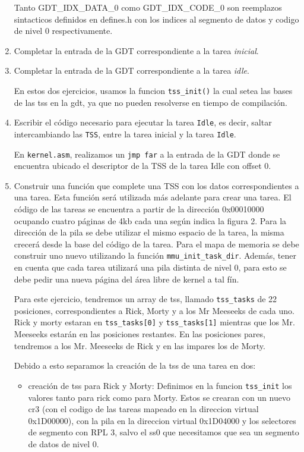 \documentclass[a4paper]{article}
\begin{document}
\begin{enumerate}[label=\alph*)]
 	
 	Tanto GDT\_IDX\_DATA\_0 como GDT\_IDX\_CODE\_0 son reemplazos sintacticos definidos en defines.h con los indices al segmento de datos y codigo de nivel 0 respectivamente.
 	
 	\item Completar la entrada de la GDT correspondiente a la tarea \textit{inicial}.
 	\item Completar la entrada de la GDT correspondiente a la tarea \textit{idle}.
 	
 	En estos dos ejercicios, usamos la funcion \texttt{tss\_init()} la cual setea las bases de las tss en la gdt, ya que no pueden resolverse en tiempo de compilaci\'on.
 	
 	\item Escribir el código necesario para ejecutar la tarea \texttt{Idle}, es decir, saltar intercambiando las \texttt{TSS}, entre la tarea inicial y la tarea \texttt{Idle}.
 	
 	En \texttt{kernel.asm}, realizamos un \texttt{jmp far} a la entrada de la GDT donde se encuentra ubicado el descriptor de la TSS de la tarea Idle con offset 0.
 	
 	\item Construir una función que complete una TSS con los datos correspondientes a una tarea. Esta función será utilizada más adelante para crear una tarea. El código de las tareas se encuentra a partir de la dirección 0x00010000 ocupando cuatro páginas de 4kb cada una según indica la figura 2. Para la dirección de la pila se debe utilizar el mismo espacio de la tarea, la misma crecerá
 	desde la base del código de la tarea. Para el mapa de memoria se debe construir uno nuevo utilizando la función \texttt{mmu\_init\_task\_dir}. Además, tener en cuenta que cada tarea utilizará una pila distinta de nivel 0, para esto se debe pedir una nueva página del área libre de kernel a tal f\'in.
 	
 	Para este ejercicio, tendremos un array de tss, llamado \texttt{tss\_tasks} de 22 posiciones, correspondientes a Rick, Morty y a los Mr Meeseeks de cada uno. Rick y morty estaran en \texttt{tss\_tasks[0]} y \texttt{tss\_tasks[1]} mientras que los Mr. Meeseeks estar\'an en las posiciones restantes. En las posiciones pares, tendremos a los Mr. Meeseeks de Rick y en las impares los de Morty. 
 	
 	Debido a esto separamos la creaci\'on de la tss de una tarea en dos:
 	
 	\begin{itemize}
 		\item creaci\'on de tss para Rick y Morty: Definimos en la funcion \texttt{tss\_init} los valores tanto para rick como para Morty. Estos se crearan con un nuevo cr3 (con el codigo de las tareas mapeado en la direccion virtual 0x1D00000), con la pila en la direccion virtual 0x1D04000 y los selectores de segmento con RPL 3, salvo el ss0 que necesitamos que sea un segmento de datos de nivel 0. 
 		

\end{itemize}
\end{enumerate}
\end{document}
